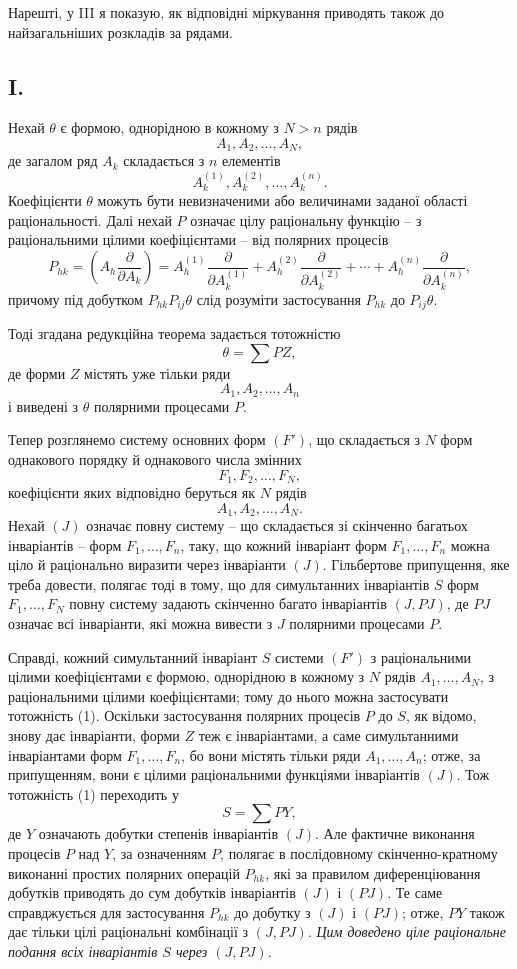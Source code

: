 \documentclass[11pt]{article}
\begin{document}
Нарешті, у III я показую, як відповідні міркування приводять також до найзагальніших розкладів за рядами.

\subsection*{I.}
Нехай $\theta$ є формою, однорідною в кожному з $N>n$ рядів
\[
  A_1,A_2,\ldots,A_N,
\]
де загалом ряд $A_k$ складається з $n$ елементів
\[
  A_k^{(1)},A_k^{(2)},\ldots,A_k^{(n)}.
\]
Коефіцієнти $\theta$ можуть бути невизначеними або величинами заданої області раціональності. Далі нехай $P$ означає цілу раціональну функцію -- з раціональними цілими коефіцієнтами -- від полярних процесів
\[
  P_{hk}=\left(A_h\frac{\partial}{\partial A_k}\right)
  =A_h^{(1)}\frac{\partial}{\partial A_k^{(1)}}+
   A_h^{(2)}\frac{\partial}{\partial A_k^{(2)}}+
   \cdots+
   A_h^{(n)}\frac{\partial}{\partial A_k^{(n)}},
\]
причому під добутком $P_{hk}P_{ij}\theta$ слід розуміти застосування $P_{hk}$ до $P_{ij}\theta$.

Тоді згадана редукційна теорема задається тотожністю
\begin{equation}
  \theta=\sum PZ,
\tag{1}
\end{equation}
де форми $Z$ містять уже тільки ряди
\[
  A_1,A_2,\ldots,A_n
\]
і виведені з $\theta$ полярними процесами $P$.

Тепер розглянемо систему основних форм $(F')$, що складається з $N$ форм однакового порядку й однакового числа змінних
\[
  F_1,F_2,\ldots,F_N,
\]
коефіцієнти яких відповідно беруться як $N$ рядів
\[
  A_1,A_2,\ldots,A_N.
\]
Нехай $(J)$ означає повну систему -- що складається зі скінченно багатьох інваріантів -- форм $F_1,\ldots,F_n$, таку, що кожний інваріант форм $F_1,\ldots,F_n$ можна ціло й раціонально виразити через інваріанти $(J)$. Гільбертове припущення, яке треба довести, полягає тоді в тому, що для симультанних інваріантів $S$ форм $F_1,\ldots,F_N$ повну систему задають скінченно багато інваріантів $(J,PJ)$, де $PJ$ означає всі інваріанти, які можна вивести з $J$ полярними процесами $P$.

Справді, кожний симультанний інваріант $S$ системи $(F')$ з раціональними цілими коефіцієнтами є формою, однорідною в кожному з $N$ рядів $A_1,\ldots,A_N$, з раціональними цілими коефіцієнтами; тому до нього можна застосувати тотожність (1). Оскільки застосування полярних процесів $P$ до $S$, як відомо, знову дає інваріанти, форми $Z$ теж є інваріантами, а саме симультанними інваріантами форм $F_1,\ldots,F_n$, бо вони містять тільки ряди $A_1,\ldots,A_n$; отже, за припущенням, вони є цілими раціональними функціями інваріантів $(J)$. Тож тотожність (1) переходить у
\[
  S=\sum PY,
\]
де $Y$ означають добутки степенів інваріантів $(J)$. Але фактичне виконання процесів $P$ над $Y$, за означенням $P$, полягає в послідовному скінченно-кратному виконанні простих полярних операцій $P_{hk}$, які за правилом диференціювання добутків приводять до сум добутків інваріантів $(J)$ і $(PJ)$. Те саме справджується для застосування $P_{hk}$ до добутку з $(J)$ і $(PJ)$; отже, $PY$ також дає тільки цілі раціональні комбінації з $(J,PJ)$. \emph{Цим доведено ціле раціональне подання всіх інваріантів $S$ через $(J,PJ)$.}
\end{document}
